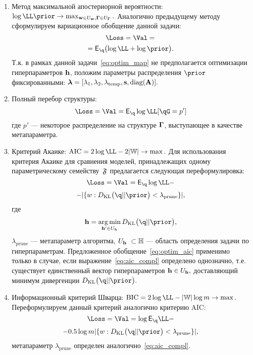 \documentclass[11pt, a5paper]{dissert}
\theoremstyle{definition}
\DeclareMathOperator*{\argmin}{arg\,min}
\begin{document}
{\begin{enumerate}
\item Метод максимальной апостериорной вероятности:
$\log \LL \prior \to \max_{\w  \in \Uw, \G \in \UG}.$
Аналогично предыдущему методу сформулируем вариационное обобщение данной задачи:
\begin{equation}
\label{eq:optim_map}
\Loss = \Val = 
\end{equation}
\[
 = \E_{\q} \bigl( \log\LL + \log\prior \bigr).
\]
Т.к. в рамках данной задачи~\eqref{eq:optim_map} не предполагается оптимизации гиперпараметров $\mathbf{h}$, положим параметры распределения $\prior$ фиксированными:
$
   \boldsymbol{\lambda} = [\lambda_1, \lambda_2, \lambda_{\text{temp}}, \mathbf{s}, \text{diag}(\mathbf{A})].
$

\item Полный перебор структуры:
\begin{equation}
\label{eq:optim_struct}
    \Loss = \Val = \E_{\q} \log \LL [\qG = p']
\end{equation}
где $p'$ --- некоторое распределение на структуре $\boldsymbol{\Gamma}$, выступающее в качестве метапараметра.




\item Критерий Акаике:
$
   \text{AIC} =  2\log \LL - 2|\Wb| \to \max.
$
Для использования критерия Акаике для сравнения моделей, принадлежащих одному параметрическому семейству~$\mathfrak{F}$ предлагается следующая переформулировка:
\begin{equation}
\label{eq:optim_aic}
    \Loss = \Val = \E_{\q}\log \LL - 
\end{equation}
\[
 - |\{w: \KL{\q}{\prior}<\lambda_\text{prune}\}|,
\]
где 
\begin{equation}\label{eq:aic_compl}\h=\argmin_{\h' \in \Uh} \KL{\q}{\prior},\end{equation} $\lambda_{\text{prune}}$ --- метапараметр алгоритма, $\Uh  \subset \Hb$ --- область определения задачи по гиперпараметрам. Предложенное обобщение~\eqref{eq:optim_aic} применимо только в случае, если выражение~\eqref{eq:aic_compl} определено однозначно, т.е. существует единственный вектор гиперпараметров  $\mathbf{h} \in U_{\mathbf{h}},$ доставляющий минимум дивергенции $\KL{\q}{\prior}.$

\item Информационный критерий Шварца:
$
    \text{BIC} = 2\log \LL - |\Wb| \log m   \to \max.
$
Переформулируем данный критерий аналогично критерию AIC:
\begin{equation}
\label{eq:optim_bic}
    \Loss = \Val = \log \E_{\q}\LL - 
\end{equation}
\[
 - 0.5 \log m |\{w: \KL{\q}{\prior}<\lambda_{\text{prune}}\}|,
\]
метапараметр $\lambda_{\text{prune}}$ определен аналогично~\eqref{eq:aic_compl}.


\end{enumerate}}
\end{document}
